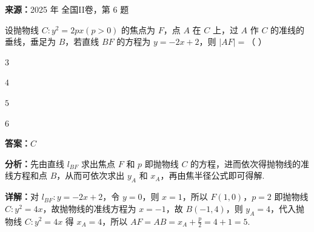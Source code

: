 \begin{question}[points=5]
\textbf{来源：}2025 年 全国II卷，第 6 题\par
设抛物线 $C:y^2=2px(p>0)$ 的焦点为 $F$，点 $A$ 在 $C$ 上，过 $A$ 作 $C$ 的准线的垂线，垂足为 $B$，若直线 $BF$ 的方程为 $y=-2x+2$，则 $|AF|=$（ ）
\begin{choices}
  \item $3$
  \item $4$
  \item $5$
  \item $6$
\end{choices}
\begin{solution}
\textbf{答案：}$C$

\textbf{分析：}先由直线 $l_{BF}$ 求出焦点 $F$ 和 $p$ 即抛物线 $C$ 的方程，进而依次得抛物线的准线方程和点 $B$，从而可依次求出 $y_A$ 和 $x_A$，再由焦半径公式即可得解.

\textbf{详解：}对 $l_{BF}:y=-2x+2$，令 $y=0$，则 $x=1$，所以 $F(1,0)$，$p=2$ 即抛物线 $C:y^2=4x$，故抛物线的准线方程为 $x=-1$，故 $B(-1,4)$，则 $y_A=4$，代入抛物线 $C:y^2=4x$ 得 $x_A=4$，所以 $AF=AB=x_A+\frac{p}{2}=4+1=5$.
\end{solution}
\end{question}

